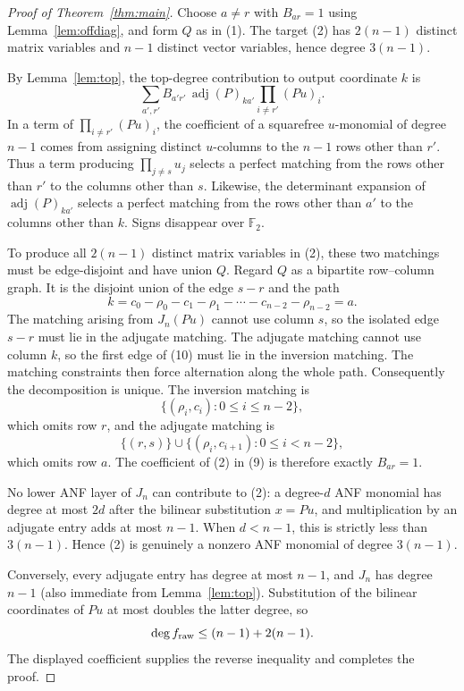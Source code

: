 \documentclass[11pt]{article}
\newcommand{\F}{\mathbb F}
\newcommand{\adj}{\operatorname{adj}}
\begin{document}
\begin{proof}[Proof of Theorem~\ref{thm:main}]
Choose $a\ne r$ with $B_{ar}=1$ using Lemma~\ref{lem:offdiag}, and form
$Q$ as in (1).  The target (2) has $2(n-1)$ distinct matrix variables and
$n-1$ distinct vector variables, hence degree $3(n-1)$.

By Lemma~\ref{lem:top}, the top-degree contribution to output coordinate
$k$ is
\[
 \sum_{a',r'} B_{a'r'}\,\adj(P)_{k a'}
                  \prod_{i\ne r'}(Pu)_i.                 \tag{9}
\]
In a term of $\prod_{i\ne r'}(Pu)_i$, the coefficient of a squarefree
$u$-monomial of degree $n-1$ comes from assigning distinct $u$-columns to
the $n-1$ rows other than $r'$.  Thus a term producing
$\prod_{j\ne s}u_j$ selects a perfect matching from the rows other than
$r'$ to the columns other than $s$.  Likewise, the determinant expansion
of $\adj(P)_{k a'}$ selects a perfect matching from the rows other than
$a'$ to the columns other than $k$.  Signs disappear over $\F_2$.

To produce all $2(n-1)$ distinct matrix variables in (2), these two
matchings must be edge-disjoint and have union $Q$.  Regard $Q$ as a
bipartite row--column graph.  It is the disjoint union of the edge $s-r$
and the path
\[
 k=c_0-\rho_0-c_1-\rho_1-\cdots-c_{n-2}-\rho_{n-2}=a.    \tag{10}
\]
The matching arising from $J_n(Pu)$ cannot use column $s$, so the isolated
edge $s-r$ must lie in the adjugate matching.  The adjugate matching cannot
use column $k$, so the first edge of (10) must lie in the inversion
matching.  The matching constraints then force alternation along the whole
path.  Consequently the decomposition is unique.  The inversion matching
is
\[
                    \{(\rho_i,c_i):0\leq i\leq n-2\},
\]
which omits row $r$, and the adjugate matching is
\[
       \{(r,s)\}\cup\{(\rho_i,c_{i+1}):0\leq i<n-2\},
\]
which omits row $a$.  The coefficient of (2) in (9) is therefore exactly
$B_{ar}=1$.

No lower ANF layer of $J_n$ can contribute to (2): a degree-$d$ ANF
monomial has degree at most $2d$ after the bilinear substitution $x=Pu$,
and multiplication by an adjugate entry adds at most $n-1$.  When
$d<n-1$, this is strictly less than $3(n-1)$.  Hence (2) is genuinely a
nonzero ANF monomial of degree $3(n-1)$.

Conversely, every adjugate entry has degree at most $n-1$, and $J_n$ has
degree $n-1$ (also immediate from Lemma~\ref{lem:top}).  Substitution of
the bilinear coordinates of $Pu$ at most doubles the latter degree, so
\[
                  \deg f_{\rm raw}\leq(n-1)+2(n-1).
\]
The displayed coefficient supplies the reverse inequality and completes
the proof.
\end{proof}
\end{document}
